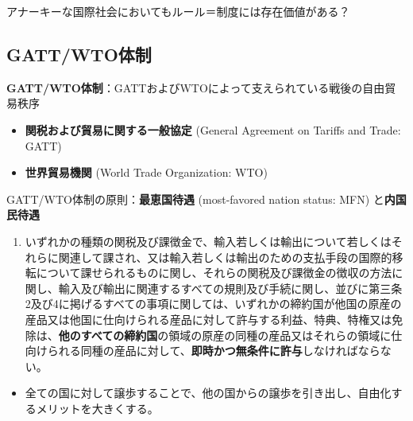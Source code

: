 \documentclass[
  xelatex,
  ja=standard]{bxjsarticle}
\providecommand{\tightlist}{%
  \setlength{\itemsep}{0pt}\setlength{\parskip}{0pt}}\usepackage{longtable,booktabs,array}
\begin{document}
アナーキーな国際社会においてもルール＝制度には存在価値がある？

\hypertarget{gattwtoux4f53ux5236}{%
\subsection{GATT/WTO体制}\label{gattwtoux4f53ux5236}}

\textbf{GATT/WTO体制}：GATTおよびWTOによって支えられている戦後の自由貿易秩序

\begin{itemize}
\tightlist
\item
  \textbf{関税および貿易に関する一般協定} (General Agreement on Tariffs
  and Trade: GATT)
\item
  \textbf{世界貿易機関} (World Trade Organization: WTO)
\end{itemize}

GATT/WTO体制の原則：\textbf{最恵国待遇} (most-favored nation status:
MFN) と\textbf{内国民待遇}

\begin{tcolorbox}[enhanced jigsaw, coltitle=black, breakable, opacitybacktitle=0.6, left=2mm, titlerule=0mm, arc=.35mm, colbacktitle=quarto-callout-note-color!10!white, opacityback=0, leftrule=.75mm, title=\textcolor{quarto-callout-note-color}{\faInfo}\hspace{0.5em}{\href{https://www.mofa.go.jp/mofaj/ecm/it/page1w_000136.html}{関税及び貿易に関する一般協定}　第1条}, toptitle=1mm, bottomrule=.15mm, colframe=quarto-callout-note-color-frame, toprule=.15mm, colback=white, rightrule=.15mm, bottomtitle=1mm]

\begin{enumerate}
\def\labelenumi{\arabic{enumi}.}
\tightlist
\item
  いずれかの種類の関税及び課徴金で、輸入若しくは輸出について若しくはそれらに関連して課され、又は輸入若しくは輸出のための支払手段の国際的移転について課せられるものに関し、それらの関税及び課徴金の徴収の方法に関し、輸入及び輸出に関連するすべての規則及び手続に関し、並びに第三条2及び4に掲げるすべての事項に関しては、いずれかの締約国が他国の原産の産品又は他国に仕向けられる産品に対して許与する利益、特典、特権又は免除は、\textbf{他のすべての締約国}の領域の原産の同種の産品又はそれらの領域に仕向けられる同種の産品に対して、\textbf{即時かつ無条件に許与}しなければならない。
\end{enumerate}

\end{tcolorbox}

\begin{itemize}
\tightlist
\item
  全ての国に対して譲歩することで、他の国からの譲歩を引き出し、自由化するメリットを大きくする。
\end{itemize}
\end{document}
